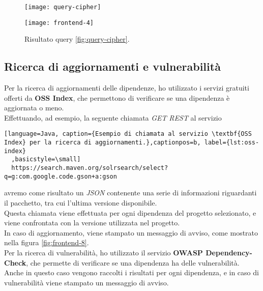 \begin{figure}[h]
  \centering
  \begin{minipage}{0.550\textwidth}
      \centering
      \texttt{[image: query-cipher]} 
      \caption{Esempio di \textit{query} Cypher per l'esplorazione dell'albero delle dipendenze.}
      \label{fig:query-cipher}
  \end{minipage}\hfill
  \begin{minipage}{0.450\textwidth}
    \centering
    \texttt{[image: frontend-4]}
    \caption{Risultato query \ref*{fig:query-cipher}.}
    \label{fig:frontend-4-bis}
  \end{minipage}
\end{figure}

\subsection*{Ricerca di aggiornamenti e vulnerabilità}
Per la ricerca di aggiornamenti delle dipendenze, ho utilizzato i servizi gratuiti offerti da \textbf{OSS Index},
che permettono di verificare se una dipendenza è aggiornata o meno.\\
Effettuando, ad esempio, la seguente chiamata \textit{GET} \textit{REST} al servizio \\
\begin{lstlisting}[language=Java, caption={Esempio di chiamata al servizio \textbf{OSS Index} per la ricerca di aggiornamenti.},captionpos=b, label={lst:oss-index}
  ,basicstyle=\small]
  https://search.maven.org/solrsearch/select?q=g:com.google.code.gson+a:gson
\end{lstlisting}
avremo come risultato un \textit{JSON} contenente una serie di informazioni riguardanti il pacchetto, tra cui
l'ultima versione disponibile.\\

Questa chiamata viene effettuata per ogni dipendenza del progetto selezionato, e viene confrontata con la versione utilizzata nel progetto.\\
In caso di aggiornamento, viene stampato un messaggio di avviso, come mostrato nella figura \ref{fig:frontend-8}.\\

Per la ricerca di vulnerabilità, ho utilizzato il servizio \textbf{OWASP Dependency-Check}, che permette di verificare se una dipendenza
ha delle vulnerabilità.\\
Anche in questo caso vengono raccolti i risultati per ogni dipendenza, e in caso di vulnerabilità viene stampato un messaggio di avviso.